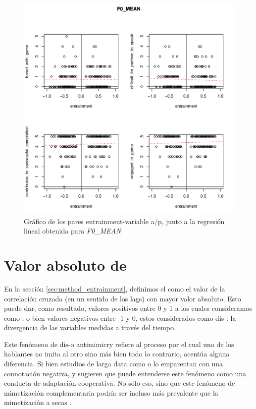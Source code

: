 \begin{figure}[b!]
\includegraphics[width=15cm]{images/regression_F0_MEAN_1.pdf}
\caption{Gráfico de los pares entrainment-variable a/p, junto a la regresión lineal obtenida para \emph{F0\_MEAN}}
\label{fig:regresion_clasica}
\end{figure}




\section{Valor absoluto de \entrainment}

En la sección \ref{sec:method_entrainment}, definimos el \entrainment como el valor de la correlación cruzada (en un sentido de los lags) con mayor valor absoluto. Esto puede dar, como resultado, valores positivos entre 0 y 1 a los cuales consideramos como \entrainment; o bien valores negativos entre -1 y 0, estos considerados como dis-\entrainment: la divergencia de las variables \ap medidas a través del tiempo.

Este fenómeno de dis-\entrainment o antimimicry \cite{CHAR1999} refiere al proceso por el cual uno de los hablantes no imita al otro sino más bien todo lo contrario, acentúa alguna diferencia. Si bien estudios de larga data como \cite{bourhis1973language} o \cite{dabbs1969similarity} lo emparentan con una connotación negativa, \cite{healey2014divergence} y \cite{levitan2015acoustic} sugieren que puede entenderse este fenómeno como una conducta de adaptación cooperativa. No sólo eso, sino que este fenómeno de mimetización complementaria podría ser incluso más prevalente que la mimetización a secas \cite{levitan2015acoustic}.

